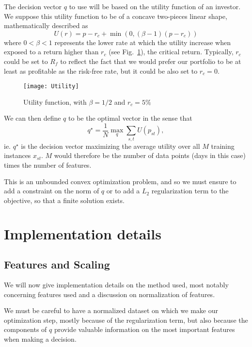 \documentclass[11pt,fleqn]{article}
\newcommand{\figref}[1]{Fig.~\ref{#1}}
\begin{document}
The decision vector $q$ to use will be based on the utility function of an investor. We
suppose this utility function to be of a concave two-pieces linear shape, mathematically
described as 
\begin{equation*}
  U(r) = p-r_c + \min(0,(\beta-1)(p-r_c))
\end{equation*}
where $0<\beta<1$ represents the lower rate at which the utility increase when exposed to
a return higher than $r_c$ (see \figref{fig:utility}), the critical return. Typically,
$r_c$ could be set to $R_f$ to reflect the fact that we would prefer our portfolio to be
at least as profitable as the risk-free rate, but it could be also set to $r_c=0$.

\begin{figure}
  \centering
  \texttt{[image: Utility]}
  \caption{Utility function, with $\beta=1/2$ and $r_c=5\%$}
  \label{fig:utility}
\end{figure}

We can then define $q$ to be the optimal vector in the sense that
\begin{equation*}
  q^\star = \frac{1}{N} \max_q \sum_{s,t} U(p_{st}),
\end{equation*}
ie. $q^\star$ is the decision vector maximizing the average utility over all $M$ training
instances $x_{st}$. $M$ would therefore be the number of data points (days in this case)
times the number of features.

This is an unbounded convex optimization problem, and so we must ensure to add a
constraint on the norm of $q$ or to add a $L_2$ regularization term to the objective, so
that a finite solution exists.

\section{Implementation details}

\subsection{Features and Scaling}

We will now give implementation details on the method used, most notably concerning
features used and a discussion on normalization of features.

We must be careful to have a normalized dataset on which we make our optimization step,
mostly because of the regularization term, but also because the components of $q$ provide
valuable information on the most important features when making a decision. 
\end{document}
